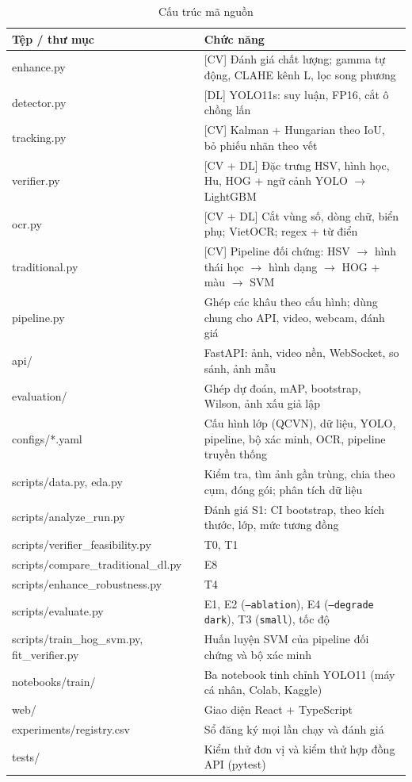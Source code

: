 \begin{table}[H]
\centering
\caption{Cấu trúc mã nguồn}
\label{tab:code_structure}
\footnotesize
\begin{tabularx}{\textwidth}{|>{\ttfamily\raggedright\arraybackslash}p{6.1cm}|X|}
\toprule
\textbf{\normalfont Tệp / thư mục} & \textbf{Chức năng} \\
\midrule
enhance.py & [CV] Đánh giá chất lượng; gamma tự động, CLAHE kênh L, lọc song phương \\ \hline
detector.py & [DL] YOLO11s: suy luận, FP16, cắt ô chồng lấn \\ \hline
tracking.py & [CV] Kalman + Hungarian theo IoU, bỏ phiếu nhãn theo vết \\ \hline
verifier.py & [CV + DL] Đặc trưng HSV, hình học, Hu, HOG + ngữ cảnh YOLO $\rightarrow$ LightGBM \\ \hline
ocr.py & [CV + DL] Cắt vùng số, dòng chữ, biển phụ; VietOCR; regex + từ điển \\ \hline
traditional.py & [CV] Pipeline đối chứng: HSV $\rightarrow$ hình thái học $\rightarrow$ hình dạng $\rightarrow$ HOG + màu $\rightarrow$ SVM \\ \hline
pipeline.py & Ghép các khâu theo cấu hình; dùng chung cho API, video, webcam, đánh giá \\ \hline
api/ & FastAPI: ảnh, video nền, WebSocket, so sánh, ảnh mẫu \\ \hline
evaluation/ & Ghép dự đoán, mAP, bootstrap, Wilson, ảnh xấu giả lập \\ \hline
configs/*.yaml & Cấu hình lớp (QCVN), dữ liệu, YOLO, pipeline, bộ xác minh, OCR, pipeline truyền thống \\ \hline
scripts/data.py, eda.py & Kiểm tra, tìm ảnh gần trùng, chia theo cụm, đóng gói; phân tích dữ liệu \\ \hline
scripts/analyze\_run.py & Đánh giá S1: CI bootstrap, theo kích thước, lớp, mức tương đồng \\ \hline
scripts/verifier\_feasibility.py & T0, T1 \\ \hline
scripts/compare\_traditional\_dl.py & E8 \\ \hline
scripts/enhance\_robustness.py & T4 \\ \hline
scripts/evaluate.py & E1, E2 (\texttt{--ablation}), E4 (\texttt{--degrade dark}), T3 (\texttt{small}), tốc độ \\ \hline
scripts/train\_hog\_svm.py, fit\_verifier.py & Huấn luyện SVM của pipeline đối chứng và bộ xác minh \\ \hline
notebooks/train/ & Ba notebook tinh chỉnh YOLO11 (máy cá nhân, Colab, Kaggle) \\ \hline
web/ & Giao diện React + TypeScript \\ \hline
experiments/registry.csv & Sổ đăng ký mọi lần chạy và đánh giá \\ \hline
tests/ & Kiểm thử đơn vị và kiểm thử hợp đồng API (pytest) \\
\bottomrule
\end{tabularx}
\end{table}

